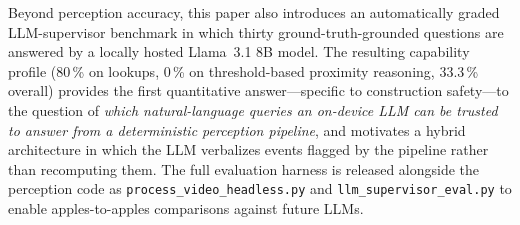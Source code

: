 \documentclass{article}
\begin{document}
Beyond perception accuracy, this paper also introduces an automatically graded LLM-supervisor benchmark in which thirty ground-truth-grounded questions are answered by a locally hosted Llama~3.1 8B model. The resulting capability profile (80\,\% on lookups, 0\,\% on threshold-based proximity reasoning, 33.3\,\% overall) provides the first quantitative answer---specific to construction safety---to the question of \emph{which natural-language queries an on-device LLM can be trusted to answer from a deterministic perception pipeline}, and motivates a hybrid architecture in which the LLM verbalizes events flagged by the pipeline rather than recomputing them. The full evaluation harness is released alongside the perception code as \texttt{process\_video\_headless.py} and \texttt{llm\_supervisor\_eval.py} to enable apples-to-apples comparisons against future LLMs.
\end{document}
